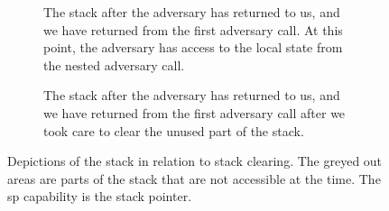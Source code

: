 \documentclass[format=acmsmall, review=true, screen=true]{acmart}
\begin{document}
\begin{figure}[ptb]
\begin{subfigure}[t]{0.3\linewidth}
  \caption{The stack after the adversary has returned to us, and we have
    returned from the first adversary call. At this point, the adversary has
    access to the local state from the nested adversary call.}
  \label{fig:illu-adv-data}
\end{subfigure}
\begin{subfigure}[t]{0.043\linewidth}
  \phantom{a}
\end{subfigure}
  \begin{subfigure}[t]{0.3\linewidth}
  \caption{The stack after the adversary has returned to us, and we have
    returned from the first adversary call after we took care to clear the
    unused part of the stack.}
  \label{fig:illu-clear-all}
  \end{subfigure}
  \caption{Depictions of the stack in relation to stack clearing.
    The greyed out areas are parts of the stack that are not accessible at the
    time.
    The sp capability is the stack pointer.}
  \label{fig:ret-adv2}
\end{figure}
\end{document}
